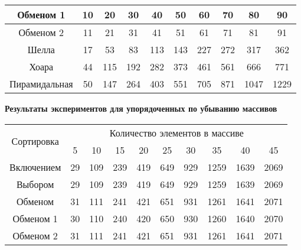 \documentclass[a4paper,14pt]{extarticle}
\begin{document}
\begin{enumerate}
\begin{center}
\begin{tabular}{|c|c|c|c|c|c|c|c|c|c|}
			      \hline
			      Обменом 1                   & 10                                                   & 20  & 30  & 40  & 50  & 60  & 70   & 80   & 90   \\
			      \hline
			      Обменом 2                   & 11                                                   & 21  & 31  & 41  & 51  & 61  & 71   & 81   & 91   \\
			      \hline
			      Шелла                       & 17                                                   & 53  & 83  & 113 & 143 & 227 & 272  & 317  & 362  \\
			      \hline
			      Хоара                       & 44                                                   & 115 & 192 & 282 & 373 & 461 & 561  & 666  & 771  \\
			      \hline
			      Пирамидальная               & 50                                                   & 147 & 264 & 403 & 551 & 705 & 871  & 1047 & 1229 \\ \hline
		      \end{tabular}\bigbreak
		      \textbf{Результаты экспериментов для упорядоченных по убыванию массивов}
		      \begin{tabular}{|c|c|c|c|c|c|c|c|c|c|}
			      \hline
			      \multirow{2}{*}{Сортировка} & \multicolumn{9}{|c|}{Количество элементов в массиве}                                                    \\
			      \cline{2-10}
			                                  & 5                                                    & 10  & 15  & 20  & 25  & 30  & 35   & 40   & 45   \\
			      \hline
			      Включением                  & 29                                                   & 109 & 239 & 419 & 649 & 929 & 1259 & 1639 & 2069 \\
			      \hline
			      Выбором                     & 29                                                   & 109 & 239 & 419 & 649 & 929 & 1259 & 1639 & 2069 \\
			      \hline
			      Обменом                     & 31                                                   & 111 & 241 & 421 & 651 & 931 & 1261 & 1641 & 2071 \\
			      \hline
			      Обменом 1                   & 30                                                   & 110 & 240 & 420 & 650 & 930 & 1260 & 1640 & 2070 \\
			      \hline
			      Обменом 2                   & 31                                                   & 111 & 241 & 421 & 651 & 931 & 1261 & 1641 & 2071 \\

\end{tabular}
\end{center}
\end{enumerate}
\end{document}
